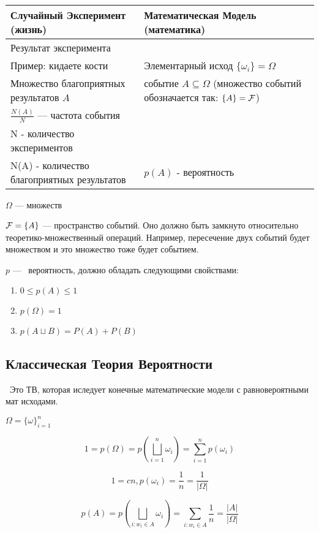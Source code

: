 	\begin{tabular}{p{}|p{}}
			Случайный Эксперимент (жизнь) & Математическая Модель (математика) \\
		\hline
		\hline
		Результат эксперимента\\ Пример: кидаете кости & Элементарный исход $ \{\omega_i\} = \Omega $  \\
		\hline
		Множество благоприятных результатов $A$ & событие $A \subseteq \Omega$ (множество событий обозначается так: $\{A\} = \mathcal{F}$) \\
		\hline
		$\frac{N(A)}{N}$ --- частота события\\ N - количество экспериментов\\ N(A) - количество благоприятных результатов & $p(A)$ - вероятность \\
		\hline
	\end{tabular}

$\Omega$ --- множеств

$\mathcal{F} = \{A\}$ --- пространство событий. Оно должно быть замкнуто относительно теоретико-множественный операций. Например, пересечение двух событий будет множеством и это множество тоже будет событием.

$p$ ---  вероятность, должно обладать следующими свойствами:
\begin{enumerate}
		\item $0 \leq p(A) \leq 1$
		\item  $p(\Omega) = 1$
		\item $p(A\sqcup B) = P(A) + P(B)$
\end{enumerate}

\subsection{Классическая Теория Вероятности}

 Это ТВ, которая иследует конечные математические  модели с равновероятными мат исходами.

$\Omega = \{\omega\}^n_{i=1}$

$$ 1 = p(\Omega) = p(\overset{n}{\underset{i=1}{\bigsqcup}}\omega_i)=\sum^n_{i=1}p(\omega_i) $$

$$ 1 = cn, p(\omega_i) = \frac1n = \frac1{|\Omega|} $$

$$ p(A) = p\left(\underset{i:w_i \in A}{\bigsqcup}\omega_i\right) = \sum_{i: w_i \in A} \frac1n = \frac{|A|}{|\Omega|}$$


